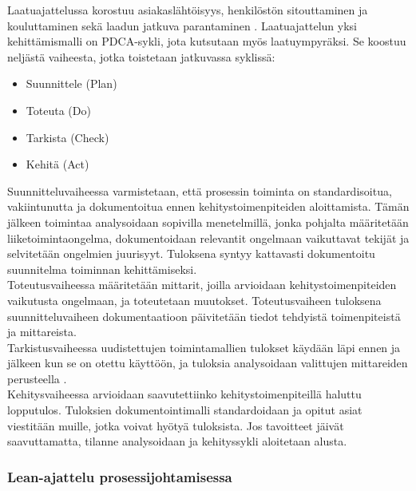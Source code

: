 \documentclass[finnish,12pt,a4paper,pdftex]{article}
\begin{document}
Laatuajattelussa korostuu asiakaslähtöisyys, henkilöstön sitouttaminen ja kouluttaminen sekä laadun jatkuva parantaminen \citep{teollisuustalous}. Laatuajattelun yksi kehittämismalli on PDCA-sykli, jota kutsutaan myös laatuympyräksi. Se koostuu neljästä vaiheesta, jotka toistetaan jatkuvassa syklissä: \\

\begin{itemize}
\setlength{\itemsep}{0pt}
    \item Suunnittele (Plan)
    \item Toteuta (Do)
    \item Tarkista (Check)
    \item Kehitä (Act)
\end{itemize}

\noindent Suunnitteluvaiheessa varmistetaan, että prosessin toiminta on standardisoitua, vakiintunutta ja dokumentoitua ennen kehitystoimenpiteiden aloittamista. Tämän jälkeen toimintaa analysoidaan sopivilla menetelmillä, jonka pohjalta määritetään liiketoimintaongelma, dokumentoidaan relevantit ongelmaan vaikuttavat tekijät ja selvitetään ongelmien juurisyyt. Tuloksena syntyy kattavasti dokumentoitu suunnitelma toiminnan kehittämiseksi. \citep{teollisuustalous, mohapatra} \\

\noindent Toteutusvaiheessa määritetään mittarit, joilla arvioidaan kehitystoimenpiteiden vaikutusta ongelmaan, ja toteutetaan muutokset. Toteutusvaiheen tuloksena suunnitteluvaiheen dokumentaatioon päivitetään tiedot tehdyistä toimenpiteistä ja mittareista. \citep{teollisuustalous, mohapatra}\\

\noindent Tarkistusvaiheessa uudistettujen toimintamallien tulokset käydään läpi ennen ja jälkeen kun se on otettu käyttöön, ja tuloksia analysoidaan valittujen mittareiden perusteella \citep{teollisuustalous}. \\

\noindent Kehitysvaiheessa arvioidaan saavutettiinko kehitystoimenpiteillä haluttu lopputulos. Tuloksien dokumentointimalli standardoidaan ja opitut asiat viestitään muille, jotka voivat hyötyä tuloksista. Jos tavoitteet jäivät saavuttamatta, tilanne analysoidaan ja kehityssykli aloitetaan alusta.\citep{teollisuustalous}

\subsubsection{Lean-ajattelu prosessijohtamisessa}
\end{document}

